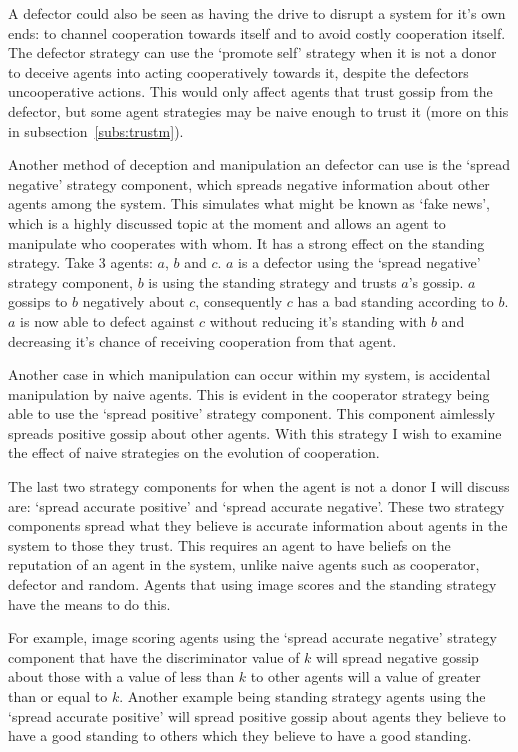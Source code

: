 \documentclass[]{final_report}
\begin{document}
A defector could also be seen as having the drive to disrupt a system for it's own ends: to channel cooperation towards itself and to avoid costly cooperation itself. The defector strategy can use the `promote self' strategy when it is not a donor to deceive agents into acting cooperatively towards it, despite the defectors uncooperative actions. This would only affect agents that trust gossip from the defector, but some agent strategies may be naive enough to trust it (more on this in subsection~\ref{subs:trustm}).\par
Another method of deception and manipulation an defector can use is the `spread negative' strategy component, which spreads negative information about other agents among the system. This simulates what might be known as `fake news', which is a highly discussed topic at the moment and allows an agent to manipulate who cooperates with whom. It has a strong effect on the standing strategy. Take 3 agents: $a$, $b$ and $c$. $a$ is a defector using the `spread negative' strategy component, $b$ is using the standing strategy and trusts $a$'s gossip. $a$ gossips to $b$ negatively about $c$, consequently $c$ has a bad standing according to $b$. $a$ is now able to defect against $c$ without reducing it's standing with $b$ and decreasing it's chance of receiving cooperation from that agent.\par
Another case in which manipulation can occur within my system, is accidental manipulation by naive agents. This is evident in the cooperator strategy being able to use the `spread positive' strategy component. This component aimlessly spreads positive gossip about other agents. With this strategy I wish to examine the effect of naive strategies on the evolution of cooperation.\par
The last two strategy components for when the agent is not a donor I will discuss are: `spread accurate positive' and `spread accurate negative'. These two strategy components spread what they believe is accurate information about agents in the system to those they trust. This requires an agent to have beliefs on the reputation of an agent in the system, unlike naive agents such as cooperator, defector and random. Agents that using image scores and the standing strategy have the means to do this.\par
For example, image scoring agents using the `spread accurate negative' strategy component that have the discriminator value of $k$ will spread negative gossip about those with a value of less than $k$ to other agents will a value of greater than or equal to $k$. Another example being standing strategy agents using the `spread accurate positive' will spread positive gossip about agents they believe to have a good standing to others which they believe to have a good standing.\par
\end{document}
